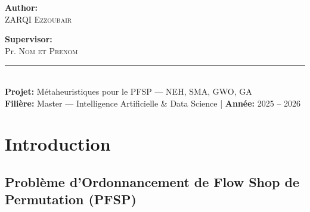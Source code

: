 \documentclass[12pt,a4paper,oneside]{report}
\begin{document}
\begin{titlepage}
\begin{center}
        \noindent
        \begin{minipage}[t]{0.48\textwidth}
            \begin{flushleft}\large
                \textcolor{MidGray}{\small\bfseries\sffamily Author:}\\[0.3cm]
                \textsc{ZARQI Ezzoubair}
            \end{flushleft}
        \end{minipage}%
        \begin{minipage}[t]{0.48\textwidth}
            \begin{flushright}\large
                \textcolor{MidGray}{\small\bfseries\sffamily Supervisor:}\\[0.3cm]
                Pr. \textsc{Nom et Prenom}
            \end{flushright}
        \end{minipage}

        \vfill

        \textcolor{BorderGray}{\rule{\linewidth}{0.4pt}}\\[0.4cm]
        {\normalsize\textbf{Projet:} M\'etaheuristiques pour le PFSP --- NEH, SMA, GWO, GA
        \\
         \textbf{Fili\`ere:} Master --- Intelligence Artificielle \& Data Science
         \quad\textcolor{BorderGray}{|}\quad
         \textbf{Ann\'ee:} 2025 -- 2026}
        \vspace*{0.6cm}

    \end{center}
\end{titlepage}

\tableofcontents
\clearpage

\chapter{Introduction}

\section{Probl\`eme d'Ordonnancement de Flow Shop de Permutation (PFSP)}
\end{document}
